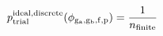 \documentclass[12pt]{article}
\begin{document}
\begin{displaymath}
p_{\rm trial}^{\rm ideal,discrete}(\phi_{\rm g_a,g_b,f,p}) = {{1}\over{n_{\rm finite}}}
\end{displaymath}
\end{document}
